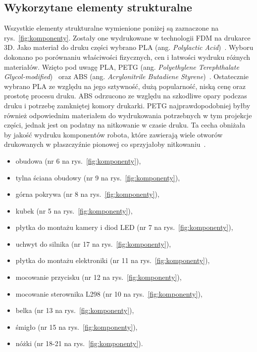 \subsection{Wykorzytane elementy strukturalne}
Wszystkie elementy strukturalne wymienione poniżej są zaznaczone na rys.~\ref{fig:komponenty}. Zostały one wydrukowane w technologii FDM na drukarce 3D. Jako materiał do druku części wybrano
PLA (ang. \textit{Polylactic Acid})~\cite{plaprusa}. Wyboru dokonano po porównaniu właściwości fizycznych, cen i łatwości wydruku różnych materiałów. Wzięto pod uwagę
PLA, PETG (ang. \textit{Polyethylene Terephthalate Glycol-modified})~\cite{PETG} oraz ABS (ang. \textit{Acrylonitrile Butadiene Styrene})~\cite{ABS}. Ostatecznie wybrano PLA ze względu na jego sztywność, dużą popularność,
niską cenę oraz prostotę procesu druku. ABS odrzucono ze względu na szkodliwe opary podczas druku i potrzebę zamkniętej komory drukarki. PETG najprawdopodobniej
byłby również odpowiednim materiałem do wydrukowania potrzebnych w tym projekcje części, jednak jest on podatny na nitkowanie w czasie druku. Ta cecha
obniżała by jakość wydruku komponentów robota, które zawierają wiele otworów drukowanych w płaszczyźnie pionowej co sprzyjałoby nitkowaniu~\cite{PLA, PLA2}.
    \begin{itemize}
        \item obudowa (nr 6 na rys.~\ref{fig:komponenty}),
        \item tylna ściana obudowy (nr 9 na rys.~\ref{fig:komponenty}),
        \item górna pokrywa (nr 8 na rys.~\ref{fig:komponenty}),
        \item kubek (nr 5 na rys.~\ref{fig:komponenty}),
        \item płytka do montażu kamery i diod LED (nr 7 na rys.~\ref{fig:komponenty}),
        \item uchwyt do silnika (nr 17 na rys.~\ref{fig:komponenty}),
        \item płytka do montażu elektroniki (nr 11 na rys.~\ref{fig:komponenty}),
        \item mocowanie przycisku (nr 12 na rys.~\ref{fig:komponenty}),
        \item mocowanie sterownika L298 (nr 10 na rys.~\ref{fig:komponenty}),
        \item belka (nr 13 na rys.~\ref{fig:komponenty}),
        \item śmigło (nr 15 na rys.~\ref{fig:komponenty}),
        \item nóżki (nr 18-21 na rys.~\ref{fig:komponenty}).
    \end{itemize}\

